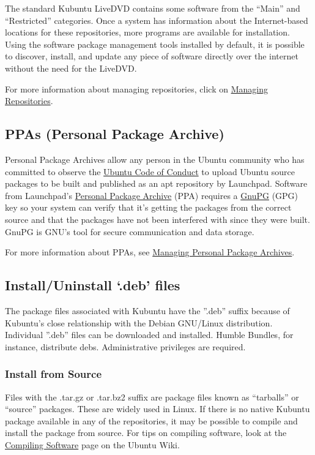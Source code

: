 \documentclass[letterpaper,10pt,english]{sphinxmanual}
\begin{document}
The standard Kubuntu LiveDVD contains some software from the ``Main'' and ``Restricted'' categories. Once a system has information about the Internet-based locations for these repositories, more programs are available for installation. Using the software package management tools installed by default, it is possible to discover, install, and update any piece of software directly over the internet without the need for the LiveDVD.

For more information about managing repositories, click on \href{https://help.ubuntu.com/community/Repositories}{Managing Repositories}.


\subsection{PPAs (Personal Package Archive)}
\label{docs/advanced:ppas-personal-package-archive}
Personal Package Archives allow any person in the Ubuntu community who has committed to observe the \href{https://launchpad.net/codeofconduct}{Ubuntu Code of Conduct} to upload Ubuntu source packages to be built and published as an apt repository by Launchpad. Software from Launchpad's \href{https://launchpad.net/ubuntu/+ppas}{Personal Package Archive} (PPA) requires a \href{https://www.gnupg.org/}{GnuPG} (GPG) key so your system can verify that it's getting the packages from the correct source and that the packages have not been interfered with since they were built. GnuPG is GNU's tool for secure communication and data storage.

For more information about PPAs, see \href{https://userbase.kde.org/Kubuntu/Advanced/Repositories\#Managing\_Personal\_Package\_Archives}{Managing Personal Package Archives}.


\subsection{Install/Uninstall `.deb' files}
\label{docs/advanced:install-uninstall-deb-files}
The package files associated with Kubuntu have the ''.deb'' suffix because of Kubuntu's close relationship with the Debian GNU/Linux distribution. Individual ''.deb'' files can be downloaded and installed. Humble Bundles, for instance, distribute debs. Administrative privileges are required.


\subsubsection{Install from Source}
\label{docs/advanced:install-from-source}
Files with the .tar.gz or .tar.bz2 suffix are package files known as ``tarballs'' or ``source'' packages. These are widely used in Linux. If there is no native Kubuntu package available in any of the repositories, it may be possible to compile and install the package from source. For tips on compiling software, look at the \href{https://help.ubuntu.com/community/CompilingSoftware}{Compiling Software} page on the Ubuntu Wiki.
\end{document}
